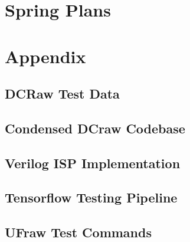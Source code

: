 \documentclass{report}
\begin{document}
\chapter{Spring Plans}

\chapter{Appendix}

\section{DCRaw Test Data} \label{dcrawdata}

\section{Condensed DCraw Codebase}

\section{Verilog ISP Implementation}

\section{Tensorflow Testing Pipeline} \label{pipelinecode}

\section{UFraw Test Commands} \label{ufrawcommands}
\end{document}
